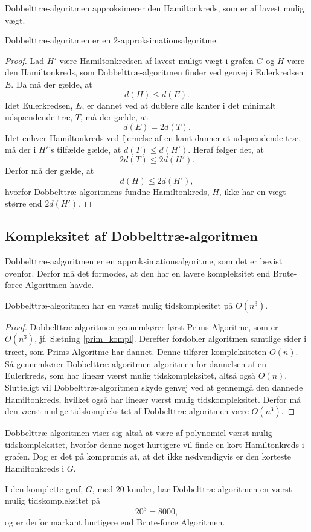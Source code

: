 Dobbelttræ-algoritmen approksimerer den Hamiltonkreds, som er af lavest mulig vægt.

\begin{thm}
Dobbelttræ-algoritmen er en 2-approksimationsalgoritme.
\end{thm}

\begin{proof}
Lad $H'$ være Hamiltonkredsen af lavest muligt vægt i grafen $G$ og $H$ være den Hamiltonkreds, som Dobbelttræ-algoritmen finder ved genvej i Eulerkredsen $E$. Da må der gælde, at $$d(H)\leq d(E).$$ 
Idet Eulerkredsen, $E$, er dannet ved at dublere alle kanter i det minimalt udspændende træ, $T$, må der gælde, at $$d(E) = 2d(T).$$
Idet enhver Hamiltonkreds ved fjernelse af en kant danner et udspændende træ, må der i $H'$'s tilfælde gælde, at $d(T) \leq d(H')$. Heraf følger det, at $$2d(T) \leq 2d(H').$$
Derfor må der gælde, at $$d(H) \leq 2d(H'),$$ hvorfor Dobbelttræ-algoritmens fundne Hamiltonkreds, $H$, ikke har en vægt større end $2d(H')$. 
\end{proof}

\subsection{Kompleksitet af Dobbelttræ-algoritmen}
Dobbelttræ-aalgoritmen er en approksimationsalgoritme, som det er bevist ovenfor. Derfor må det formodes, at den har en lavere kompleksitet end Brute-force Algoritmen havde.

\begin{thm}
Dobbelttræ-algoritmen har en værst mulig tidskomplesitet på $O(n^3)$.
\end{thm}

\begin{proof}
Dobbelttræ-algoritmen gennemkører først Prims Algoritme, som er $O(n^3)$, jf. Sætning \ref{prim_kompl}. 
Derefter fordobler algoritmen samtlige sider i træet, som Prims Algoritme har dannet. Denne tilfører kompleksiteten $O(n)$.
Så gennemkører Dobbelttræ-algoritmen algoritmen for dannelsen af en Eulerkreds, som har lineær værst mulig tidskompleksitet, altså også $O(n)$.
Slutteligt vil Dobbelttræ-algoritmen skyde genvej ved at gennemgå den dannede Hamiltonkreds, hvilket også har lineær værst mulig tidskompleksitet. 
Derfor må den værst mulige tidskompleksitet af Dobbelttræ-algoritmen være $O(n^3)$.
\end{proof}

Dobbelttræ-algoritmen viser sig altså at være af polynomiel værst mulig tidskompleksitet, hvorfor denne noget hurtigere vil finde en kort Hamiltonkreds i grafen. Dog er det på kompromis at, at det ikke nødvendigvis er den korteste Hamiltonkreds i $G$.

\begin{exmp}
I den komplette graf, $G$, med $20$ knuder, har Dobbelttræ-algoritmen en værst mulig tidskompleksitet på $$20^3 = 8000,$$ og er derfor markant hurtigere end Brute-force Algoritmen.
\end{exmp}




